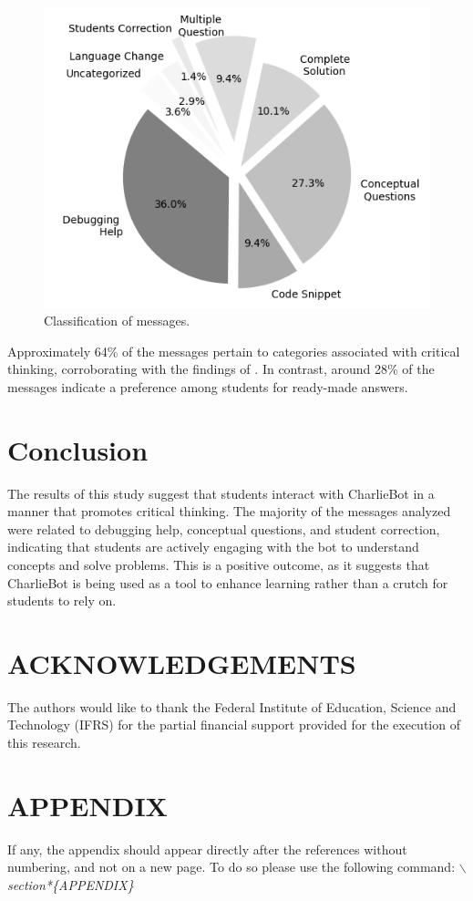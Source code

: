 \documentclass[a4paper,twoside]{article}
\begin{document}
\begin{figure}[h!]
    \centering
    \includegraphics[scale=0.55]{img/figure1.png}
    \caption{Classification of messages.}
    \label{fig:graph1}
\end{figure}

Approximately 64\% of the messages pertain to categories associated with
critical thinking, corroborating with the findings of
\cite{Ghimire24}. In contrast, around 28\% of the messages
indicate a preference among students for ready-made answers.

\section{Conclusion}

The results of this study suggest that students interact with CharlieBot in a
manner that promotes critical thinking. The majority of the messages analyzed
were related to debugging help, conceptual questions, and student correction,
indicating that students are actively engaging with the bot to understand
concepts and solve problems. This is a positive outcome, as it suggests that
CharlieBot is being used as a tool to enhance learning rather than a crutch for
students to rely on.

\section*{ACKNOWLEDGEMENTS}

The authors would like to thank the Federal Institute of Education, Science and
Technology (IFRS) for the partial financial support provided for the execution
of this research.


{\small
}

\section*{\uppercase{Appendix}}

If any, the appendix should appear directly after the
references without numbering, and not on a new page. To do so please use the
following command: \textit{$\backslash$section*\{APPENDIX\}}
\end{document}
